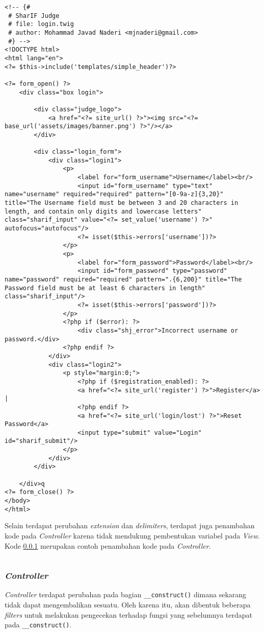 \begin{lstlisting}[caption=Perubahan \textit{view} pada \textit{Login.php}, label=kode:loginViewBab4]
<!-- {#
 # SharIF Judge
 # file: login.twig
 # author: Mohammad Javad Naderi <mjnaderi@gmail.com>
 #} -->
<!DOCTYPE html>
<html lang="en">
<?= $this->include('templates/simple_header')?>

<?= form_open() ?>
	<div class="box login">

		<div class="judge_logo">
			<a href="<?= site_url() ?>"><img src="<?= base_url('assets/images/banner.png') ?>"/></a>
		</div>

		<div class="login_form">
			<div class="login1">
				<p>
					<label for="form_username">Username</label><br/>
					<input id="form_username" type="text" name="username" required="required" pattern="[0-9a-z]{3,20}" title="The Username field must be between 3 and 20 characters in length, and contain only digits and lowercase letters" class="sharif_input" value="<?= set_value('username') ?>" autofocus="autofocus"/>
					<?= isset($this->errors['username'])?>
				</p>
				<p>
					<label for="form_password">Password</label><br/>
					<input id="form_password" type="password" name="password" required="required" pattern=".{6,200}" title="The Password field must be at least 6 characters in length" class="sharif_input"/>
					<?= isset($this->errors['password'])?>
				</p>
				<?php if ($error): ?>
					<div class="shj_error">Incorrect username or password.</div>
				<?php endif ?>
			</div>
			<div class="login2">
				<p style="margin:0;">
					<?php if ($registration_enabled): ?>
					<a href="<?= site_url('register') ?>">Register</a> |
					<?php endif ?>
					<a href="<?= site_url('login/lost') ?>">Reset Password</a>
					<input type="submit" value="Login" id="sharif_submit"/>
				</p>
			</div>
		</div>

	</div>q
<?= form_close() ?>
</body>
</html>
\end{lstlisting}

Selain terdapat perubahan \textit{extension} dan \textit{delimiters}, terdapat juga penambahan kode pada \textit{Controller} karena tidak mendukung pembentukan variabel pada \textit{View}. Kode \ref{} merupakan contoh penambahan kode pada \textit{Controller}.

\begin{lstlisting}[caption=Perubahan \textit{view} pada \textit{Login.php}, label=kode:loginViewBab4]

\end{lstlisting}

\subsubsection{\textit{Controller}}
\textit{Controller} terdapat perubahan pada bagian \texttt{\_\_construct()} dimana sekarang tidak dapat mengembalikan sesuatu. Oleh karena itu, akan dibentuk beberapa \textit{filters} untuk melakukan pengecekan terhadap fungsi yang sebelumnya terdapat pada \texttt{\_\_construct()}.